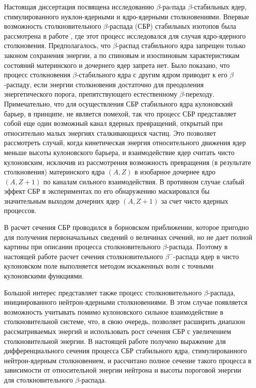 Настоящая диссертация посвящена исследованию $\beta$-раcпада
$\beta$-ста\-биль\-ных
ядер, стимулированного нуклон-ядерными и ядро-ядерными столкновениями. Впервые возможность столкновительного
$\beta$-распада \linebreak (СБР) стабильных изотопов была рассмотрена в работе \cite{batkin}, где этот процесс
исследовался для случая ядро-ядерного столкновения. Предполагалось, что $\beta$-распад стабильного ядра запрещен только
законом сохранения энергии, а по спиновым и изоспиновым характеристикам состояний материнского и дочернего ядер запрета
нет. Было показано, что процесс столкновения
$\beta$-стабильного ядра с другим ядром
приводит к его $\beta$-распаду, если энергии столкновения достаточно для
преодоления энергетического порога, препятствующего естественному
$\beta$-переходу.
Примечательно, что для осуществления СБР стабильного ядра кулоновский барьер,
в принципе, не является помехой, так что процесс СБР представляет собой еще
один возможный канал ядерных превращений, открытый при относительно малых
энергиях сталкивающихся частиц.
Это позволяет рассмотреть случай, когда кинетическая энергия относительного
движения ядер меньше высоты кулоновского барьера, и взаимодействие ядер считать
чисто кулоновским, исключив из рассмотрения возможность превращения
(в результате столкновения) материнского ядра $(A,Z)$ в изобарное дочернее
ядро $(A,Z+1)$ по каналам сильного взаимодействия. В противном случае слабый
эффект СБР в экспериментах по его обнаружению маскировался бы значительным
выходом дочерних ядер $(A,Z+1)$ за счет чисто ядерных процессов.

В \cite{batkin} расчет сечения СБР проводился в борновском приближении, которое пригодно для получения первоначальных
сведений о величинах сечений, но не дает полной картины при описании процесса столкновительного
$\beta$-распада. Поэтому в настоящей работе расчет сечения столкновительного
$\beta^-$-распада ядер в чисто кулоновском поле выполняется
методом искаженных волн с точными кулоновскими функциями.

Большой интерес представляет также процесс столкновительного
$\beta$-распада, инициированного нейтрон-ядерными столкновениями.
В этом случае появляется возможность учитывать помимо кулоновского
сильное взаимодействие в столкновительной системе, что, в свою очередь,
позволяет расширить диапазон рассматриваемых энергий и использовать рост
сечения СБР с увеличением столкновительной энергии. В настоящей работе
получено выражение для дифференциального сечения процесса СБР стабильного
ядра, стимулированного нейтрон-ядерным столкновением, и рассчитано полное
сечение такого процесса в зависимости от относительной энергии нейтрона и
высоты пороговой энергии для столкновительного $\beta$-распада.


